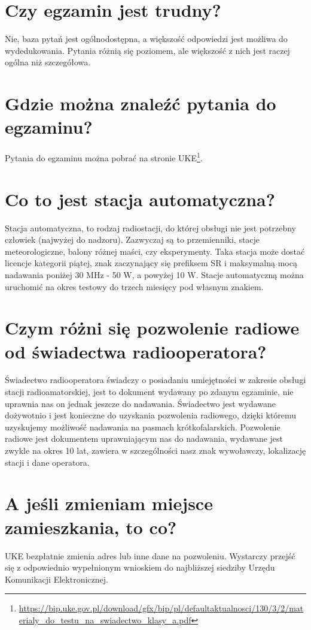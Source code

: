 \documentclass[a4paper,12pt]{article}
\begin{document}
\section{Czy egzamin jest trudny?}
Nie, baza pytań jest ogólnodostępna, a większość odpowiedzi jest możliwa do wydedukowania. Pytania różnią się poziomem, ale większość z nich jest raczej ogólna niż szczegółowa.

\section{Gdzie można znaleźć pytania do egzaminu?}
Pytania do egzaminu można pobrać na stronie UKE\footnote{\url{https://bip.uke.gov.pl/download/gfx/bip/pl/defaultaktualnosci/130/3/2/materialy_do_testu_na_swiadectwo_klasy_a.pdf}}.

\section{Co to jest stacja automatyczna?}
Stacja automatyczna, to rodzaj radiostacji, do której obsługi nie jest potrzebny człowiek (najwyżej do nadzoru). Zazwyczaj są to przemienniki, stacje meteorologiczne, balony różnej maści, czy eksperymenty. Taka stacja może dostać licencje kategorii piątej, znak zaczynający się prefiksem SR i maksymalną mocą nadawania poniżej 30 MHz - 50 W, a powyżej 10 W.
Stacje automatyczną można uruchomić na okres testowy do trzech miesięcy pod własnym znakiem.

\section{Czym różni się pozwolenie radiowe od świadectwa radiooperatora?}
Świadectwo radiooperatora świadczy o posiadaniu umiejętności w zakresie obsługi stacji radioamatorskiej, jest to dokument wydawany po zdanym egzaminie, nie uprawnia nas on jednak jeszcze do nadawania. Świadectwo jest wydawane dożywotnio i jest konieczne do uzyskania pozwolenia radiowego, dzięki któremu uzyskujemy możliwość nadawania na pasmach krótkofalarskich. Pozwolenie radiowe jest dokumentem uprawniającym nas do nadawania, wydawane jest zwykle na okres 10 lat, zawiera w szczególności nasz znak wywoławczy, lokalizację stacji i dane operatora.

\section{A jeśli zmieniam miejsce zamieszkania, to co?}
UKE bezpłatnie zmienia adres lub inne dane na pozwoleniu. Wystarczy przejść się z odpowiednio wypełnionym wnioskiem do najbliższej siedziby Urzędu Komunikacji Elektronicznej.
\end{document}
